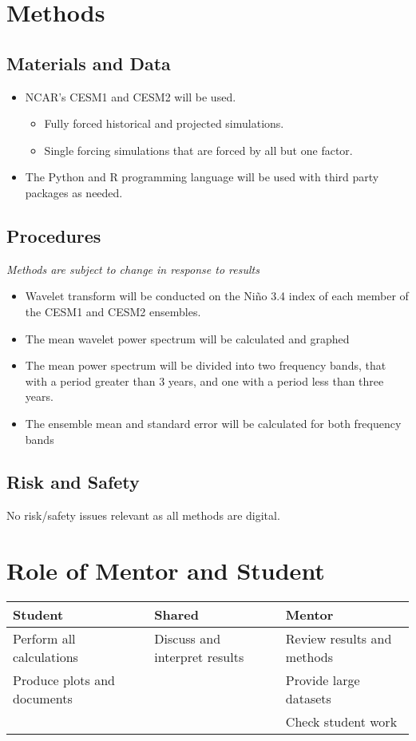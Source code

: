 \documentclass[11pt]{article}
\begin{document}
\section{Methods}
\label{sec:org4b357da}
\subsection{Materials and Data}
\label{sec:orgab15497}
\begin{itemize}
\item NCAR's CESM1 and CESM2 will be used.
\begin{itemize}
\item Fully forced historical and projected simulations.
\item Single forcing simulations that are forced by all but one factor.
\end{itemize}
\item The Python and R programming language will be used with third party packages as needed.
\end{itemize}

\subsection{Procedures}
\label{sec:org0ae14af}
\emph{Methods are subject to change in response to results}
\begin{itemize}
\item Wavelet transform will be conducted on the Niño 3.4 index of each member of the CESM1 and CESM2 ensembles.
\item The mean wavelet power spectrum will be calculated and graphed
\item The mean power spectrum will be divided into two frequency bands, that with a period greater than 3 years, and one with a period less than three years.
\item The ensemble mean and standard error will be calculated for both frequency bands
\end{itemize}

\subsection{Risk and Safety}
\label{sec:orgc939962}
No risk/safety issues relevant as all methods are digital.

\section{Role of Mentor and Student}
\label{sec:org7d01d61}
\begin{center}
\begin{tabular}{lll}
Student & Shared & Mentor\\
\hline
Perform all calculations & Discuss and interpret results & Review results and methods\\
Produce plots and documents &  & Provide large datasets\\
 &  & Check student work\\
\end{tabular}
\end{center}



\end{document}
